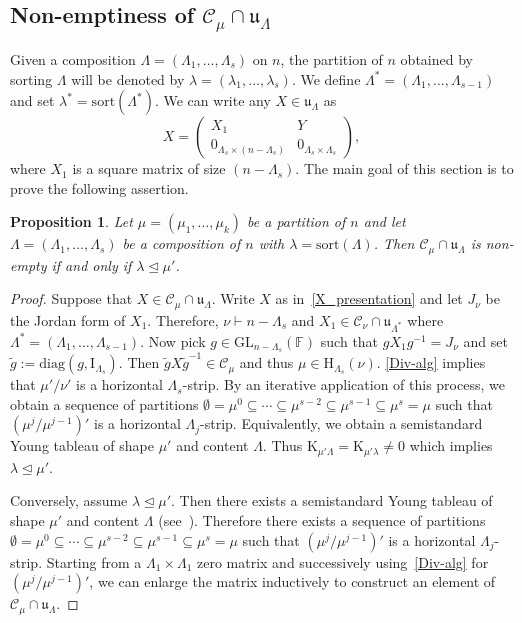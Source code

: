 \documentclass[12pt,a4paper,reqno]{amsart}
\theoremstyle{plain}
\newtheorem{proposition}[theorem]{Proposition}
\theoremstyle{definition}
\newcommand{\less}{\unlhd}
\newcommand{\FF}{{\mathbb{F}}}
\newcommand{\1}{\mathds{1}}
\newcommand{\C}{\mathcal{C}}
\newcommand{\GL}{\mathrm{GL}}
\newcommand{\HH}{\mathrm{H}}
\newcommand{\K}{{\mathrm{K}}}
\renewcommand{\u}{\mathfrak{u}}
\begin{document}
\subsection{Non-emptiness of $\C_\mu\cap \u_\Lambda$} Given a composition $\Lambda=(\Lambda_1,\dots,\Lambda_s)$ on $n$, the partition of $n$ obtained by sorting  $\Lambda$ will be denoted by $\lambda=(\lambda_1,\dots,\lambda_s)$. 
We
define $\Lambda^*=(\Lambda_1,\dots,\Lambda_{s-1})$ and 
set $\lambda^*=\mathrm{sor
t}(\Lambda^*)$.
We can write any $X\in\u_\Lambda$ as
\begin{equation}\label{X_presentation}
X=\left(\begin{array}{c|c}
X_1 & Y\\ \hline
0_{\Lambda_s\times (n-\Lambda_s)} & 0_{\Lambda_s\times \Lambda_s}
\end{array}\right),
\end{equation}
where $X_1$ is  a square matrix of size $(n-\Lambda_s)$.
The main goal of this section is to prove the following assertion.
\begin{proposition}\label{Gale-Ryser-application} Let $\mu=(\mu_1,\dots,\mu_k)$ be a partition of $n$ and let $\Lambda=(\Lambda_1,\dots,\Lambda_s)$ be a composition of $n$ with $\lambda=\mathrm{sort}(\Lambda)$. Then $\C_\mu\cap \u_\Lambda$ is non-empty if and only if $\lambda\unlhd \mu'$. 
\end{proposition}



\begin{proof}
Suppose that $X\in \C_\mu\cap\u_\Lambda$.
Write $X$ as in~\cref{X_presentation} and let $J_\nu$ be the Jordan form of $X_1$.   Therefore, $\nu\vdash n-\Lambda_s$ and $X_1\in \C_\nu\cap \u_{\Lambda^*}$ where $\Lambda^*=(\Lambda_1,\dots,\Lambda_{s-1})$. Now pick $g\in \GL_{n-\Lambda_s}(\FF)$ such that $gX_1g^{-1}=J_{\nu}$ and set 
$\tilde{g}:=\mathrm{diag}(g,\mathrm{I}_{\Lambda_s})$. Then 
$\tilde gX\tilde g^{-1}\in \C_\mu$
and  thus $\mu\in \HH_{\Lambda_s}(\nu)$. \cref{Div-alg} implies that $\mu'/\nu'$ is a horizontal $\Lambda_s$-strip. By an iterative application of this process, we obtain a sequence of partitions $\emptyset=\mu^0\subseteq\cdots \subseteq\mu^{s-2}\subseteq \mu^{s-1}\subseteq \mu^{s}=\mu$ such that $(\mu^j/\mu^{j-1})'$ is a horizontal $\Lambda_j$-strip. Equivalently, we obtain a semistandard Young tableau of shape $\mu'$ and content $\Lambda$. Thus $\K_{\mu'\Lambda}=\K_{\mu'\lambda}\neq 0$ which implies $\lambda\less\mu'$.


Conversely, assume $\lambda\less\mu'$. Then there exists a semistandard Young tableau of shape $\mu'$ and content $\Lambda$ 
(see~\cite[Exercise A.11, p. 457]{Fulton-Harris}). Therefore there exists a sequence of partitions $\emptyset=\mu^0\subseteq\cdots \subseteq\mu^{s-2}\subseteq \mu^{s-1}\subseteq \mu^{s}=\mu$ such that $(\mu^j/\mu^{j-1})'$ is a horizontal $\Lambda_j$-strip. Starting from a $\Lambda_1\times \Lambda_1$ zero matrix and successively using~\cref{Div-alg} for $(\mu^j/\mu^{j-1})'$, we can enlarge the matrix inductively to construct an element of $\C_\mu\cap\u_\Lambda$.
\end{proof}
\end{document}
